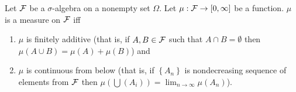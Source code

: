 \begin{theorem}
    Let ${\cal F}$ be a $\sigma$-algebra on a nonempty set $\Omega$. Let $\mu : {\cal F} \to  [0, \infty]$ be a function. $\mu$ is a measure on ${\cal F}$ iff 
	\begin{enumerate}
	    \item$\mu$ is finitely additive (that is, if $A,B \in {\cal F}$ such that $A\cap B =\emptyset$ then $\mu (A \cup B) = \mu (A) + \mu (B)$) and 
	    \item $\mu$ is continuous from below (that is, if $\left\{ A_n \right\}$ is nondecreasing sequence of elements from ${\cal F}$ then $\mu\left( \bigcup \left( A_i \right) \right) = \lim_{n\to\infty} \mu \left( A_n \right)$).
	    \end{enumerate}
    \label{thm:equiv-measure}
\end{theorem}
